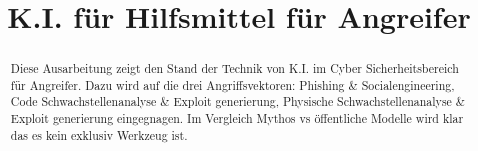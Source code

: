 \documentclass[conference]{IEEEtran}
\begin{document}
%
\title{K.I. für Hilfsmittel für Angreifer}


\author{
\and
{}
\and
{}}


% 








\maketitle

\begin{abstract}
Diese Ausarbeitung zeigt den Stand der Technik von K.I. im Cyber Sicherheitsbereich für Angreifer. Dazu wird auf die drei Angriffsvektoren: Phishing \& Socialengineering, Code Schwachstellenanalyse \& Exploit generierung, Physische Schwachstellenanalyse \& Exploit generierung eingegnagen. Im Vergleich Mythos vs öffentliche Modelle wird klar das es kein exklusiv Werkzeug ist.
\end{abstract}
\end{document}
